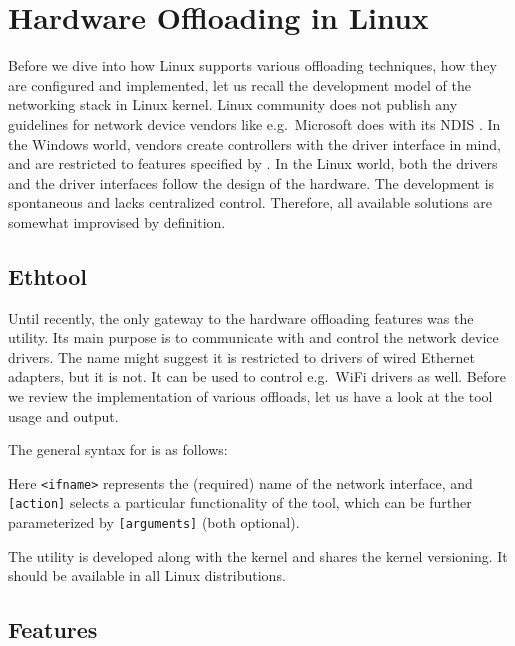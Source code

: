 \chapter{Hardware Offloading in Linux}
\label{chap:linux}

Before we dive into how Linux supports various offloading techniques, how they
are configured and implemented, let us recall the development
model of the networking stack in Linux kernel. Linux
community does not publish any guidelines for network device vendors like
e.g.\ Microsoft does with its \acrfull{NDIS} \cite{NDIS}. In the Windows world,
vendors create controllers with the driver interface in mind, and are
restricted to features specified by . In the Linux world, both the
drivers and the driver interfaces follow the design of the hardware. The
development is spontaneous and lacks centralized control. Therefore, all available
solutions are somewhat improvised by definition.

\section{Ethtool}

Until recently, the only gateway to the hardware offloading features was the
 utility. Its main purpose is to communicate with and
control the network device drivers. The name might suggest it is restricted to
drivers of wired Ethernet adapters, but it is not. It can be used to control e.g.\ WiFi
drivers as well. Before we review the implementation of various offloads, let
us have a look at the tool usage and output.

The general syntax for  is as follows:


Here \texttt{<ifname>} represents the (required) name of the network
interface, and \texttt{[action]} selects a particular functionality of the
tool, which can be further parameterized by \texttt{[arguments]} (both
optional).

The utility is developed along with the kernel and shares the kernel
versioning. It should be available in all Linux distributions.

\section{Features}

